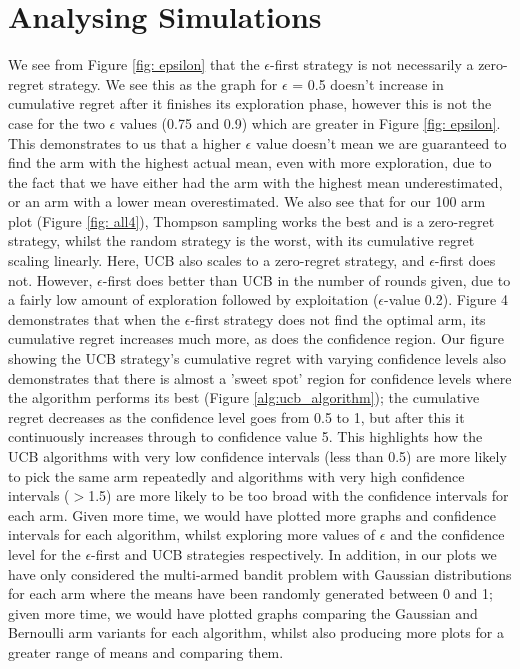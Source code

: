 \section{Analysing Simulations}\label{sec:analysing-simulations}
We see from Figure \ref{fig: epsilon} that the $\epsilon$-first strategy is not necessarily a zero-regret strategy.
We see this as the graph for $\epsilon$ = 0.5 doesn't increase in cumulative regret after it finishes its exploration phase, however this is not the case for the two $\epsilon$ values (0.75 and 0.9) which are greater in Figure \ref{fig: epsilon}.
This demonstrates to us that a higher $\epsilon$ value doesn't mean we are guaranteed to find the arm with the highest actual mean, even with more exploration, due to the fact that we have either had the arm with the highest mean underestimated, or an arm with a lower mean overestimated.
\newline
We also see that for our 100 arm plot (Figure \ref{fig: all4}), Thompson sampling works the best and is a zero-regret strategy, whilst the random strategy is the worst, with its cumulative regret scaling linearly.
Here, UCB also scales to a zero-regret strategy, and $\epsilon$-first does not.
However, $\epsilon$-first does better than UCB in the number of rounds given, due to a fairly low amount of exploration followed by exploitation ($\epsilon$-value 0.2).
\newline
Figure 4 demonstrates that when the $\epsilon$-first strategy does not find the optimal arm, its cumulative regret increases much more, as does the confidence region.
\newline
Our figure showing the UCB strategy's cumulative regret with varying confidence levels also demonstrates that there is almost a 'sweet spot' region for confidence levels where the algorithm performs its best (Figure \ref{alg:ucb_algorithm});
the cumulative regret decreases as the confidence level goes from 0.5 to 1, but after this it continuously increases through to confidence value 5.
This highlights how the UCB algorithms with very low confidence intervals (less than 0.5) are more likely to pick the same arm repeatedly and algorithms with very high confidence intervals ($>$1.5) are more likely to be too broad with the confidence intervals for each arm.
\newline
Given more time, we would have plotted more graphs and confidence intervals for each algorithm, whilst exploring more values of $\epsilon$ and the confidence level for the $\epsilon$-first and UCB strategies respectively. 
In addition, in our plots we have only considered the multi-armed bandit problem with Gaussian distributions for each arm where the means have been randomly generated between 0 and 1;
given more time, we would have plotted graphs comparing the Gaussian and Bernoulli arm variants for each algorithm, whilst also producing more plots for a greater range of means and comparing them.